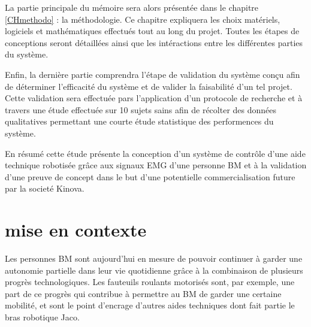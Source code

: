 \documentclass[letterpaper, twoside, 12pt, memoire, creativecommons, hyperref]{thETS}
\begin{document}
\begin{introduction}
La partie principale du mémoire sera alors présentée dans le chapitre \ref{CHmethodo} : la méthodologie. Ce chapitre expliquera les choix matériels, logiciels et mathématiques effectués tout au long du projet. Toutes les étapes de conceptions seront détaillées ainsi que les intéractions entre les différentes parties du système. 

Enfin, la dernière partie comprendra l'étape de validation du système conçu afin de déterminer l'efficacité du système et de valider la faisabilité d'un tel projet. Cette validation sera effectuée pars l'application d'un protocole de recherche et à travers une étude effectuée sur 10 sujets sains afin de récolter des données qualitatives permettant une courte étude statistique des performences du système.

En résumé cette étude présente la conception d'un système de contrôle d'une aide technique robotisée grâce aux signaux EMG d'une personne BM et à la validation d'une preuve de concept dans le but d'une potentielle commercialisation future par la societé Kinova.

%



\end{introduction}

%
%

\chapter{mise en contexte}
\label{CHmiseencontexte}

Les personnes BM sont aujourd'hui en mesure de pouvoir continuer à garder une autonomie partielle dans leur vie quotidienne grâce à la combinaison de plusieurs progrès technologiques. Les fauteuils roulants motorisés sont, par exemple, une part de ce progrès qui contribue à permettre au BM de garder une certaine mobilité, et sont le point d'encrage d'autres aides techniques dont fait partie le bras robotique Jaco.
\end{document}
